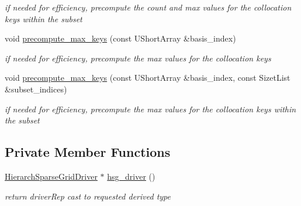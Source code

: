 \begin{DoxyCompactItemize}
\begin{DoxyCompactList}\small\item\em if needed for efficiency, precompute the count and max values for the collocation keys within the subset \end{DoxyCompactList}\item 
void \hyperlink{classPecos_1_1SharedHierarchInterpPolyApproxData_a01d4893d40fc53f6193cef94658443a9}{precompute\+\_\+max\+\_\+keys} (const U\+Short\+Array \&basis\+\_\+index)
\begin{DoxyCompactList}\small\item\em if needed for efficiency, precompute the max values for the collocation keys \end{DoxyCompactList}\item 
void \hyperlink{classPecos_1_1SharedHierarchInterpPolyApproxData_affd9fbab13d20744790f0b5267e4eceb}{precompute\+\_\+max\+\_\+keys} (const U\+Short\+Array \&basis\+\_\+index, const Sizet\+List \&subset\+\_\+indices)
\begin{DoxyCompactList}\small\item\em if needed for efficiency, precompute the max values for the collocation keys within the subset \end{DoxyCompactList}\end{DoxyCompactItemize}
\subsection*{Private Member Functions}
\begin{DoxyCompactItemize}
\item 
\hyperlink{classPecos_1_1HierarchSparseGridDriver}{Hierarch\+Sparse\+Grid\+Driver} $\ast$ \hyperlink{classPecos_1_1SharedHierarchInterpPolyApproxData_a5015aad6b9a74c80793ab30ef0812ee6}{hsg\+\_\+driver} ()\label{classPecos_1_1SharedHierarchInterpPolyApproxData_a5015aad6b9a74c80793ab30ef0812ee6}

\begin{DoxyCompactList}\small\item\em return driver\+Rep cast to requested derived type \end{DoxyCompactList}\end{DoxyCompactItemize}
